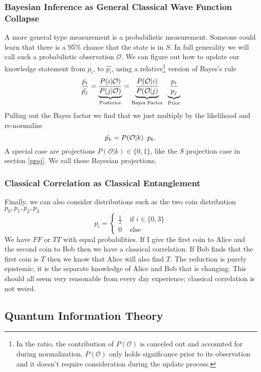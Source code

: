 \documentclass[12pt,a4paper]{article}
\begin{document}
\subsubsection{Bayesian Inference as General Classical Wave Function Collapse}
A more general type measurement is a probabilistic measurement.  Someone could learn that there is a 95\% chance that the state is in $S$.  In full generality we will call such a probabilistic observation $\mathcal{O}$.  We can figure out how to update our knowledge statement from $p_i$, to $\hat{p_i}$, using a relative\footnote{In the ratio, the contribution of $P(\mathcal{O})$ is canceled out and accounted for during normalization.  $P(\mathcal{O})$ only holds significance prior to its observation and it doesn't require consideration during the update process.} version of Bayes's rule
\[
  \frac{\hat{p_i}}{\hat{p_j}} = \underbrace{\frac{P(i | \mathcal{O})}{P(j | \mathcal{O})}}_\text{Posterior}
                              = \underbrace{\frac{P(\mathcal{O} | i)}{P(\mathcal{O}|j)}}_\text{Bayes Factor}  \hspace{0.07 in}  \underbrace{\frac{p_i}{p_j}}_\text{Prior}
\]
Pulling out the Bayes factor we find that we just multiply by the likelihood and re-normalize
\[
  \hat{p_k} =  P(\mathcal{O} | k) \hspace{0.07 in} p_k.
\]
A special case are projections $P(\mathcal{O} | k) \in \{0,1\}$, like the $S$ projection case in section \ref{proj}.  We call these Bayesian projections.

\subsubsection{Classical Correlation as Classical Entanglement}
Finally, we can also consider distributions such as the two coin distribution $p_0,p_1,p_2,p_3$
\[
p_i = 
\left\{
\begin{split}
\frac{1}{2} & \mbox{ if } i \in \{0,3\}\\
0 &\mbox{ else }
\end{split}
\right.
\]
We have $FF$ or $TT$ with equal probabilities.  If I give the first coin to Alice and the second coin to Bob then we have a classical correlation.  If Bob finds that the first coin is $T$ then we know that Alice will also find $T$.  The reduction is purely epistemic, it is the separate knowledge of Alice and Bob that is changing.  This should all seem very reasonable from every day experience; classical correlation is not weird.

\subsection{Quantum Information Theory}
\end{document}
